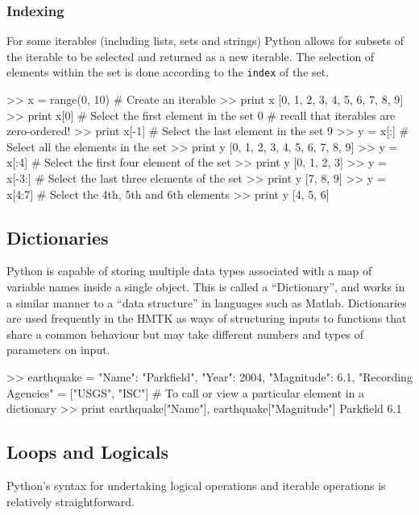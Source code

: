 \subsubsection{Indexing}

For some iterables (including lists, sets and strings) Python allows for subsets of the iterable to be selected and returned as a new iterable. The selection of elements within the set is done according to the \verb=index= of the set. 

\begin{python}[frame=single]
>> x = range(0, 10)  # Create an iterable
>> print x
[0, 1, 2, 3, 4, 5, 6, 7, 8, 9]
>> print x[0] # Select the first element in the set
0             # recall that iterables are zero-ordered!
>> print x[-1] # Select the last element in the set
9
>> y = x[:] # Select all the elements in the set
>> print y
[0, 1, 2, 3, 4, 5, 6, 7, 8, 9]
>> y = x[:4]  # Select the first four element of the set
>> print y
[0, 1, 2, 3]
>> y = x[-3:] # Select the last three elements of the set
>> print y
[7, 8, 9]
>> y = x[4:7] # Select the 4th, 5th and 6th elements
>> print y
[4, 5, 6]
\end{python}

\subsection{Dictionaries}

Python is capable of storing multiple data types associated with a map of variable names inside a single object. This is called a ``Dictionary'', and works in a similar manner to a ``data structure'' in languages such as Matlab. Dictionaries are used frequently in the HMTK as ways of structuring inputs to functions that share a common behaviour but may take different numbers and types of parameters on input.

\begin{python}[frame=single]
>> earthquake = {"Name": "Parkfield",
                 "Year": 2004,
                 "Magnitude": 6.1,
                 "Recording Agencies" = ["USGS", "ISC"]}
# To call or view a particular element in a dictionary
>> print earthquake["Name"], earthquake["Magnitude"]
Parkfield 6.1
\end{python}

\subsection{Loops and Logicals}

Python's syntax for undertaking logical operations and iterable operations is relatively straightforward.


